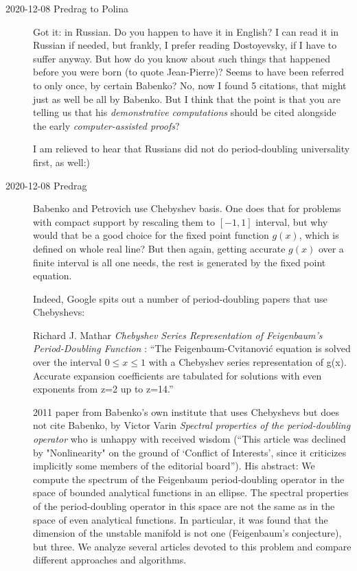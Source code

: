 \begin{description}
\item[2020-12-08 Predrag to Polina]
Got it:
{in Russian}.
Do you happen to have it in English? I can read it in Russian if needed,
but frankly, I prefer reading Dostoyevsky, if I have to suffer anyway.
But how do you know about such things that happened before you were born
(to quote Jean-Pierre)? Seems to have been referred to only once, by
certain Babenko? No, now I found 5 citations, that might just as well be
all by Babenko. But I think that the point is that you are telling us
that his \emph{demonstrative computations} should be cited alongside the early
\emph{computer-assisted proofs}?

I am relieved to hear that Russians did not do period-doubling
universality first, as well:)

\item[2020-12-08 Predrag]
Babenko and Petrovich use Chebyshev basis. One does that for
problems with compact support by rescaling them to $[-1,1]$ interval, but
why would that be a good choice for the fixed point function $g(x)$,
which is defined on whole real line? But then again, getting accurate
$g(x)$ over a finite interval is all one needs, the rest is generated by
the fixed point equation.

Indeed, Google spits out a number of period-doubling papers that use
Chebyshevs:

Richard J. Mathar
{\em Chebyshev Series Representation of Feigenbaum's
Period-Doubling Function} :
``The Feigenbaum-Cvitanovi\'c equation is solved over the interval
$0\leq{x}\leq1$ with a Chebyshev series representation of g(x). Accurate
expansion coefficients are tabulated for solutions with even exponents
from z=2 up to z=14.''

2011 paper from Babenko's own institute that uses
Chebyshevs but does not cite Babenko, by
Victor Varin {\em Spectral properties of the period-doubling operator}
 who is unhappy with received wisdom (``This article was
declined by "Nonlinearity" on the ground of `Conflict of Interests',
since it criticizes implicitly some members of the editorial board'').
His abstract: We compute the spectrum of the Feigenbaum period-doubling
operator in the space of bounded analytical functions in an ellipse. The
spectral properties of the period-doubling operator in this space are not
the same as in the space of even analytical functions. In particular, it
was found that the dimension of the unstable manifold is not one
(Feigenbaum's conjecture), but three. We analyze several articles devoted
to this problem and compare different approaches and algorithms.


\end{description}
